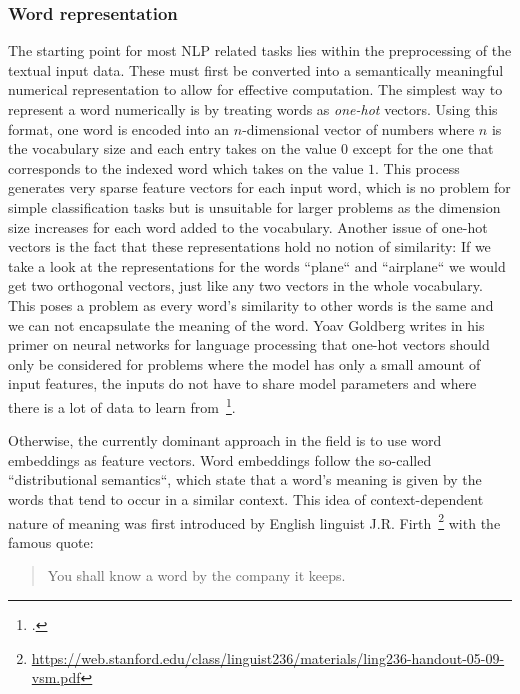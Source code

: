 \subsubsection{Word representation}
\label{sub:word_representation}

The starting point for most NLP related tasks lies within the preprocessing of the textual input data. These must first be converted into a semantically meaningful numerical representation to allow for effective computation. The simplest way to represent a word numerically is by treating words as \textit{one-hot} vectors. Using this format, one word is encoded into an $ n $-dimensional vector of numbers where $ n $ is the vocabulary size and each entry takes on the value $ 0 $ except for the one that corresponds to the indexed word which takes on the value $ 1 $. This process generates very sparse feature vectors for each input word, which is no problem for simple classification tasks but is unsuitable for larger problems as the dimension size increases for each word added to the vocabulary. Another issue of one-hot vectors is the fact that these representations hold no notion of similarity: If we take a look at the representations for the words “plane“ and “airplane“ we would get two orthogonal vectors, just like any two vectors in the whole vocabulary. This poses a problem as every word's similarity to other words is the same and we can not encapsulate the meaning of the word. Yoav Goldberg writes in his primer on neural networks for language processing that one-hot vectors should only be considered for problems where the model has only a small amount of input features, the inputs do not have to share model parameters and where there is a lot of data to learn from~\footcite{DBLP:journals/corr/Goldberg15c}.

Otherwise, the currently dominant approach in the field is to use word embeddings as feature vectors. Word embeddings follow the so-called “distributional semantics“, which state that a word's meaning is given by the words that tend to occur in a similar context. This idea of context-dependent nature of meaning was first introduced by English linguist J.R. Firth~\footnote{\url{https://web.stanford.edu/class/linguist236/materials/ling236-handout-05-09-vsm.pdf}} with the famous quote:

\begin{quote}
  You shall know a word by the company it keeps.
\end{quote}


